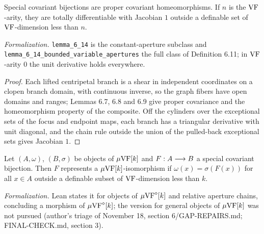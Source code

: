 \setcounter{theorem}{13}
\begin{lemma}
\label{spec-inve}
\leanok
{}
Special covariant bijections are proper covariant homeomorphisms. If $n$ is the $\mathrm{VF}$-arity, they are totally differentiable with Jacobian $1$ outside a definable set of $\mathrm{VF}$-dimension less than $n$.

\emph{Formalization.} \texttt{lemma\_6\_14} is the constant-aperture subclass and \texttt{lemma\_6\_14\_bounded\_variable\_apertures} the full class of Definition 6.11; in $\mathrm{VF}$-arity $0$ the unit derivative holds everywhere.
\end{lemma}

\begin{proof}
\leanok
Each lifted centripetal branch is a shear in independent coordinates on a clopen branch domain, with continuous inverse, so the graph fibers have open domains and ranges; Lemmas 6.7, 6.8 and 6.9 give proper covariance and the homeomorphism property of the composite. Off the cylinders over the exceptional sets of the focus and endpoint maps, each branch has a triangular derivative with unit diagonal, and the chain rule outside the union of the pulled-back exceptional sets gives Jacobian $1$.
\end{proof}

\setcounter{theorem}{14}
\begin{remark}
\label{spec-is-iso}
\leanok
{}
Let $(A,\omega)$, $(B,\sigma)$ be objects of $\mu\mathrm{VF}[k]$ and $F:A\longrightarrow B$ a special covariant bijection. Then $F$ represents a $\mu\mathrm{VF}[k]$-isomorphism if $\omega(x)=\sigma(F(x))$ for all $x\in A$ outside a definable subset of $\mathrm{VF}$-dimension less than $k$.

\emph{Formalization.} Lean states it for objects of $\mu\mathrm{VF}^{\diamond}[k]$ and relative aperture chains, concluding a morphism of $\mu\mathrm{VF}^{\diamond}[k]$; the version for general objects of $\mu\mathrm{VF}[k]$ was not pursued (author's triage of November 18, section 6/GAP-REPAIRS.md; FINAL-CHECK.md, section 3).
\end{remark}

